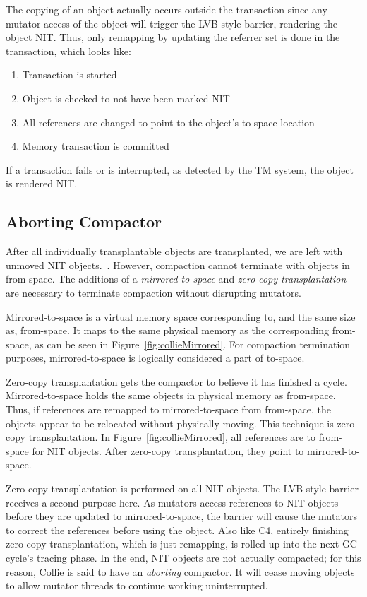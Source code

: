 \documentclass{sig-alternate}
\begin{document}
The copying of an object actually occurs outside the transaction since any
mutator access of the object will trigger the LVB-style barrier,
rendering the object NIT. Thus, only remapping by updating the referrer set
is done in the transaction, which looks like:
\begin{enumerate}
\item Transaction is started
\item Object is checked to not have been marked NIT
\item All references are changed to point to the object's to-space location
\item Memory transaction is committed
\end{enumerate}
If a transaction fails or is interrupted, as detected by the TM system, the object is rendered NIT.


\subsection{Aborting Compactor}
\label{sec:collieAbortion}

After all individually transplantable objects are transplanted, we
are left with unmoved NIT objects.~\cite{Iyengar:Collie}.
However, compaction cannot terminate with objects in from-space.
The additions of a \emph{mirrored-to-space} and \emph{zero-copy transplantation} are necessary
to terminate compaction without disrupting mutators.

Mirrored-to-space is a virtual memory space corresponding to, and the same
size as, from-space. It maps to the same physical
memory as the corresponding from-space, as can be seen in Figure~\ref{fig:collieMirrored}. For compaction 
termination purposes, mirrored-to-space is logically considered a part of to-space.

Zero-copy transplantation gets the compactor to believe it has finished a cycle.
Mirrored-to-space holds the same objects in physical memory as from-space.
Thus, if references
are remapped to mirrored-to-space from from-space,
the objects appear to be relocated without physically moving. This technique
is zero-copy transplantation. In Figure~\ref{fig:collieMirrored},
all references are to from-space for NIT objects. After zero-copy transplantation, they
point to mirrored-to-space.

Zero-copy transplantation
is performed on all NIT objects. The LVB-style barrier receives a second purpose here. As mutators
access references to NIT objects before they are updated to mirrored-to-space, 
the barrier will cause the mutators to correct the references before using the object. Also like
C4, entirely finishing zero-copy transplantation, which is just remapping, is rolled
up into the next GC cycle's tracing phase. In the end, NIT objects are not actually compacted;
for this reason, Collie is said to have an \emph{aborting} compactor. It will
cease moving objects to allow mutator threads to continue working uninterrupted.
\end{document}
